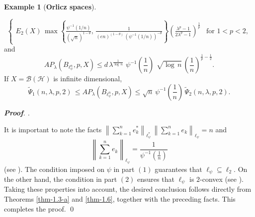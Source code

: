 \documentclass[a4paper,11pt, reqno]{amsart}
\theoremstyle{definition}
\newtheorem{example}{Example}[section]
\newenvironment{pf}[1][]{%
	\vskip 3mm
	\noindent
	\ifthenelse{\equal{#1}{}}%
	{{\slshape {\bf Proof}. }}%
	{{\slshape #1.} }%
}%
{\qed\bigskip}
\newcommand{\norm}[1]{\left\lVert#1\right\rVert}
\begin{document}
\begin{example} [{\bf Orlicz spaces}]
\begin{enumerate}
\begin{equation*}
\begin{cases}
					E_{2}(X)\,  \max \left\{\frac{\psi^{-1}(1/n)}{(\sqrt{n})^{1-\theta}}, \, \frac{1}{(en)^{(1-\theta)}\, (\psi^{-1}(1/n))^{-\theta}}\right\}\left(\frac{\lambda^p -1}{2\lambda^p - 1}\right)^{\frac{1}{p}}  & \text{for $1<p< 2$}, 
				\end{cases}
			\end{equation*}
			and 
			$$AP_{\lambda}(B_{\ell^n_{\psi}}, p,X) \leq d\,  \lambda^{\frac{1}{\log\,n}}\, \,\psi^{-1}\left(\frac{1}{n}\right)\,\, \sqrt{\log \, n}\, \left(\frac{1}{n}\right)^{\frac{1}{p}-\frac{1}{2}}.$$
			If $X=\mathcal{B}(\mathcal{H})$ is infinite dimensional, 
			$$\tilde{\Psi}_{1}(n,\lambda,p,2) \, \leq AP_{\lambda}(B_{\ell^n_{\psi}}, p,X) \leq \sqrt{n}\, \psi^{-1}\left(\frac{1}{n}\right) \, \tilde{\Psi}_{2}(n,\lambda,p,2).
			$$
		\end{enumerate}
	\end{example}
	\begin{pf}
		It is important to note the facts $\norm{\sum_{k=1}^{n}e^{*}_{k}}_{\ell_{\psi}^{*}}\, \norm{\sum_{k=1}^{n}e_{k}}_{\ell_{\psi}}=n$ 
		and
		$$
		\norm{\sum_{k=1}^{n}e_{k}}_{\ell_{\psi}}=\frac{1}{\psi^{-1}\left(\frac{1}{n}\right)}
		$$
		(see \cite[p.192]{defant-2003}). The condition imposed on $\psi$ in part $(1)$ guarantees that $\ell_{\psi} \subseteq \ell_2$.  On the other hand, the condition in part $(2)$ ensures that $\ell_{\psi}$ is $2$-convex (see \cite[p.189]{defant-2003}). Taking these properties into account, the desired conclusion follows directly from Theorems \ref{thm-1.3-a} and \ref{thm-1.6}, together with the preceding facts. This completes the proof.
	\end{pf}	
\end{document}
